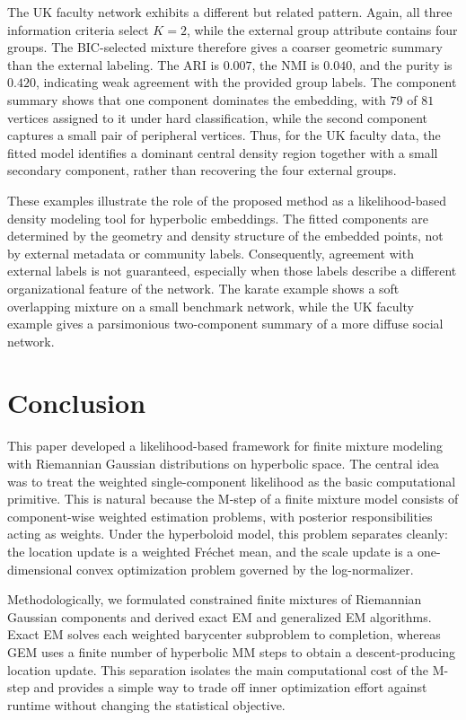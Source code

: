 \documentclass[11pt]{article}
\begin{document}
The UK faculty network exhibits a different but related pattern. Again, all three information criteria select \(K=2\), while the external group attribute contains four groups. The BIC-selected mixture therefore gives a coarser geometric summary than the external labeling. The ARI is \(0.007\), the NMI is \(0.040\), and the purity is \(0.420\), indicating weak agreement with the provided group labels. The component summary shows that one component dominates the embedding, with \(79\) of \(81\) vertices assigned to it under hard classification, while the second component captures a small pair of peripheral vertices. Thus, for the UK faculty data, the fitted model identifies a dominant central density region together with a small secondary component, rather than recovering the four external groups.

These examples illustrate the role of the proposed method as a likelihood-based density modeling tool for hyperbolic embeddings.  The fitted components are determined by the geometry and density structure of the embedded points, not by external metadata or community labels.  Consequently, agreement with external labels is not guaranteed, especially when those labels describe a different organizational feature of the network.  The karate example shows a soft overlapping mixture on a small benchmark network, while the UK faculty example gives a parsimonious two-component summary of a more diffuse social network.


\section{Conclusion}\label{sec:conclusion}

This paper developed a likelihood-based framework for finite mixture modeling with Riemannian Gaussian distributions on hyperbolic space. The central idea was to treat the weighted single-component likelihood as the basic computational primitive. This is natural because the M-step of a finite mixture model consists of component-wise weighted estimation problems, with posterior responsibilities acting as weights. Under the hyperboloid model, this problem separates cleanly: the location update is a weighted Fr\'echet mean, and the scale update is a one-dimensional convex optimization problem governed by the log-normalizer.

Methodologically, we formulated constrained finite mixtures of Riemannian Gaussian components and derived exact EM and generalized EM algorithms. Exact EM solves each weighted barycenter subproblem to completion, whereas GEM uses a finite number of hyperbolic MM steps to obtain a descent-producing location update. This separation isolates the main computational cost of the M-step and provides a simple way to trade off inner optimization effort against runtime without changing the statistical objective.
\end{document}
